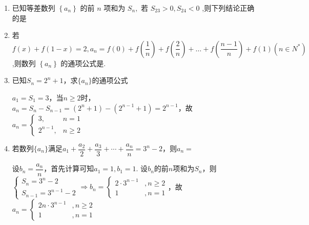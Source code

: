 \begin{enumerate}
    \item 已知等差数列 $\left\{  {a}_{n}\right\}$ 的前 $n$ 项和为 ${S}_{n},$ 若 ${S}_{23} > 0,{S}_{24} < 0$ ,则下列结论正确的是 

    \item 若 $ f\left( x\right)  + f\left( {1 - x}\right)  = 2,{a}_{n} = f\left( 0\right)  + f\left( \dfrac{1}{n}\right)  + f\left( \dfrac{2}{n}\right)  + \ldots  + f\left( \dfrac{n - 1}{n}\right)  + f\left( 1\right) \left( {n \in  {N}^{ * }}\right) $ ,则数列 $ \left\{  {a}_{n}\right\} $ 的通项公式是.

    \item 已知$S_n = 2^n+1$，求$\{a_n\}$的通项公式
    \begin{jieda}
        $a_1 = S_1 = 3$，当$n \geq 2$时，$a_n = S_n - S_{n-1} = (2^n+1) - (2^{n-1}+1) = 2^{n-1}$，故$a_n = \left\{\begin{array}{ll}
             3, & n = 1 \\
             2^{n-1}, & n \geq 2
        \end{array}\right.$
    \end{jieda}
    \item 若数列$\{a_n\}$满足$a_1 + \dfrac{a_2}{2} + \dfrac{a_3}{3} + \cdots + \dfrac{a_n}{n} = 3^n - 2$，则$a_n = $
    \begin{jieda}
        设$b_n = \dfrac{a_n}{n}$，首先计算可知$a_1 = 1, b_1 = 1$. 设$b_n$的前$n$项和为$S_n$，则$\left \{ \begin{array}{l}
            S_n = 3^n - 2  \\
            S_{n-1} = 3^{n-1} - 2
        \end{array} \right. \Rightarrow b_n = \left \{\begin{array}{ll}
            2 \cdot 3^{n-1} & ,n \geq 2  \\
            1 & ,n = 1 
        \end{array} \right .$，故$a_n = \left \{\begin{array}{ll}
            2n \cdot3^{n-1} & ,n \geq 2  \\
            1 & ,n = 1 
        \end{array} \right .$
    \end{jieda}



\end{enumerate}
